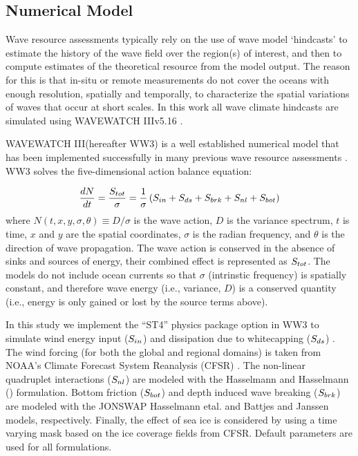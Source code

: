 \subsection{Numerical Model} \label{sec:method:model}

Wave resource assessments typically rely on the use of wave model `hindcasts' to estimate the history of the wave field over the region(s) of interest, and then to compute estimates of the theoretical resource from the model output. The reason for this is that in-situ or remote measurements do not cover the oceans with enough resolution, spatially and temporally, to characterize the spatial variations of waves that occur at short scales. 
In this work all wave climate hindcasts are simulated using WAVEWATCH III\textregistered v5.16 \citep{tolmanDistributedmemoryConceptsWave2002,tolmanwavewatch}.

WAVEWATCH III\textregistered (hereafter WW3) is a  well established numerical model that has been implemented successfully in many previous wave resource assessments \citep[e.g.,][]{garcia-medinaWaveResourceAssessment2014,hemerRevisedAssessmentAustralia2017,yangWaveModelTest2017}.
WW3 solves the five-dimensional action balance equation:

\begin{align}
  \frac{d N}{d t} = \frac{S_{ tot }}{\sigma} = \frac{1}{\sigma}\left ( S_{ in } + S_{ ds } + S_{ brk } + S_{ nl } + S_{ bot } \right )
\end{align}
where $N(t,x,y,\sigma,\theta) \equiv D/\sigma$ is the wave action, $D$ is the variance spectrum, $t$ is time, $x$ and $y$ are the spatial coordinates, $\sigma$ is the radian frequency, and $\theta$ is the direction of wave propagation.
The wave action is conserved in the absence of sinks and sources of energy, their combined effect is represented as $S_{ tot }$.
The models do not include ocean currents so that $\sigma$ (intrinstic frequency) is spatially constant, and therefore wave energy (i.e., variance, $D$) is a conserved quantity (i.e., energy is only gained or lost by the source terms above).

In this study we implement the ``ST4'' physics package option in WW3 to simulate wind energy input ($S_{ in }$) and dissipation due to whitecapping ($S_{ ds }$) \citep{ardhuinObservationSwellDissipation2009}.
The wind forcing (for both the global and regional domains) is taken from NOAA's Climate Forecast System Reanalysis (CFSR) \citep{sahaNCEPClimateForecast2010}. The non-linear quadruplet interactions ($S_{ nl }$) are modeled with the Hasselmann and Hasselmann (\citeyear{hasselmannComputationsParameterizationsNonlinear1985}) formulation. Bottom friction ($S_{ bot }$) and depth induced wave breaking ($S_{ brk }$) are modeled with the JONSWAP Hasselmann etal. \citeyear{hasselmannMeasurementsWindwaveGrowth1973} and Battjes and Janssen \citeyear{battjesEnergyLossSetup1978} models, respectively. Finally, the effect of sea ice is considered by using a time varying mask based on the ice coverage fields from CFSR. Default parameters are used for all formulations.

